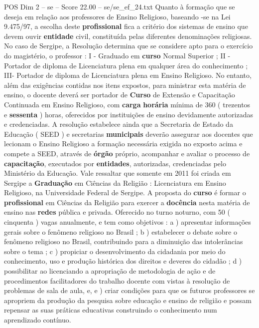 \begin{textsample}{POS Dim 2 – se – Score 22.00 – se/se\_ef\_24.txt}
Quanto à formação que se deseja em relação aos professores de Ensino Religioso, baseando -se na Lei 9.475/97, a escolha deste \textbf{profissional} fica a critério dos sistemas de ensino que devem ouvir \textbf{entidade} civil, constituída pelas diferentes denominações religiosas.
No caso de Sergipe, a Resolução determina que se considere apto para o exercício do magistério, o professor : I - Graduado em \textbf{curso} Normal Superior ; II - Portador de diploma de Licenciatura plena em qualquer área do conhecimento ; III- Portador de diploma de Licenciatura plena em Ensino Religioso.
No entanto, além das exigências contidas nos itens expostos, para ministrar esta matéria de ensino, o docente deverá ser portador de \textbf{Curso} de Extensão e Capacitação Continuada em Ensino Religioso, com \textbf{carga} \textbf{horária} mínima de 360 ( trezentos e \textbf{sessenta} ) horas, oferecidos por instituições de ensino devidamente autorizadas e credenciadas.
A resolução estabelece ainda que a Secretaria de Estado da Educação ( SEED ) e secretarias \textbf{municipais} deverão assegurar aos docentes que lecionam o Ensino Religioso a formação necessária exigida no exposto acima e compete a SEED, através de \textbf{órgão} próprio, acompanhar e avaliar o processo de \textbf{capacitação}, executados por \textbf{entidades}, autorizadas, credenciadas pelo Ministério da Educação.
Vale ressaltar que somente em 2011 foi criada em Sergipe a \textbf{Graduação} em Ciências da Religião : Licenciatura em Ensino Religioso, na Universidade Federal de Sergipe.
A proposta do \textbf{curso} é formar o \textbf{profissional} em Ciências da Religião para exercer a \textbf{docência} nesta matéria de ensino nas \textbf{redes} pública e privada.
Oferecido no turno noturno, com 50 ( cinquenta ) vagas anualmente, e tem como objetivos : a ) apresentar informações gerais sobre o fenômeno religioso no Brasil ; b ) estabelecer o debate sobre o fenômeno religioso no Brasil, contribuindo para a diminuição das intolerâncias sobre o tema ; c ) propiciar o desenvolvimento da cidadania por meio do conhecimento, uso e produção histórica dos direitos e deveres do cidadão ; d ) possibilitar ao licenciando a apropriação de metodologia de ação e de procedimentos facilitadores do trabalho docente com vistas à resolução de problemas de sala de aula, e, e ) criar condições para que os futuros professores se apropriem da produção da pesquisa sobre educação e ensino de religião e possam repensar as suas práticas educativas construindo o conhecimento num aprendizado contínuo.

\end{textsample}
